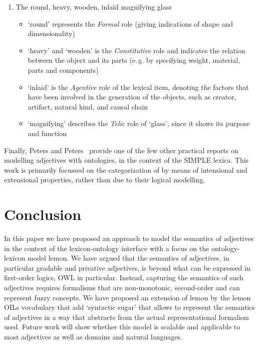 \documentclass[11pt]{article}
\begin{document}
\begin{enumerate}
\item The round, heavy, wooden, inlaid magnifying glass \label{ex:qualia}
\begin{itemize}[noitemsep]
\item `round' represents the \textit{Formal} role (giving indications of shape and dimensionality)
\item `heavy' and `wooden' is the \textit{Constitutive} role and indicates the relation between the object and its parts (e.\,g. by specifying weight, material, parts and components)
\item `inlaid' is the \textit{Agentive} role of the lexical item, denoting the factors that have been involved in the generation of the objects, such as creator, artifact, natural kind, and causal chain
\item `magnifying' describes the \textit{Telic} role of `glass', since it shows its purpose and function
\end{itemize}
\end{enumerate}

Finally, Peters and Peters~ provide one of the few other practical reports on modelling adjectives with ontologies, in the context of the SIMPLE lexica. This work is primarily focussed on the categorization of by means of intensional and extensional properties, rather than due to their logical modelling. 

\section{Conclusion}

In this paper we have proposed an approach to model the semantics of adjectives in the context 
of the lexicon-ontology interface with a focus on the ontology-lexicon model lemon. We have argued that the semantics of adjectives, in particular gradable and privative adjectives, is beyond what can be expressed in first-order logics, OWL in particular. Instead, capturing the semantics of such adjectives requires formalisms that are non-monotonic, second-order and can represent fuzzy concepts. We have proposed an extension of lemon by the lemon OILs vocabulary that add `syntactic sugar' that allows to represent the semantics of adjectives in a way that abstracts from the actual representational formalism used. Future work will show whether this model is scalable and applicable to most adjectives as well as domains and natural languages.





\end{document}
